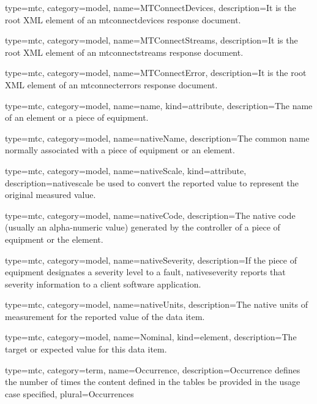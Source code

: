 {
  type=mtc,
  category=model,
  name={MTConnectDevices},
  description={It is the root XML element of an \gls{mtconnectdevices response document}.}
}


{
  type=mtc,
  category=model,
  name={MTConnectStreams},
  description={It is the root XML element of an \gls{mtconnectstreams response document}.}
}

{
  type=mtc,
  category=model,
  name={MTConnectError},
  description={It is the root XML element of an \gls{mtconnecterrors response document}.}
}


{
  type=mtc,
  category=model,
  name={name},
  kind={attribute},
  description={The name of an element or a piece of equipment.}
}


{
  type=mtc,
  category=model,
  name={nativeName},
  description={The common name normally associated with a piece of equipment or an element.}
}


{
  type=mtc,
  category=model,
  name={nativeScale},
  kind={attribute},
  description={\gls{nativescale} \MAY be used to convert the reported value to represent the original measured value.}
}


{
  type=mtc,
  category=model,
  name={nativeCode},
  description={The native code (usually an alpha-numeric value) generated by the controller of a piece of equipment or the element.}
}


{
  type=mtc,
  category=model,
  name={nativeSeverity},
  description={If the piece of equipment designates a severity level to a fault, \gls{nativeseverity} reports that severity information to a client software application. }
}


{
  type=mtc,
  category=model,
  name={nativeUnits},
  description={The native units of measurement for the reported value of the data item.}
}



{
  type=mtc,
  category=model,
  name={Nominal},
  kind={element},
  description={The target or expected value for this data item.}
}


{
  type=mtc,
  category=term,
  name={Occurrence},
  description={Occurrence defines the number of times the content defined in the tables \MAY be provided in the usage case specified},
  plural={Occurrences}
}


